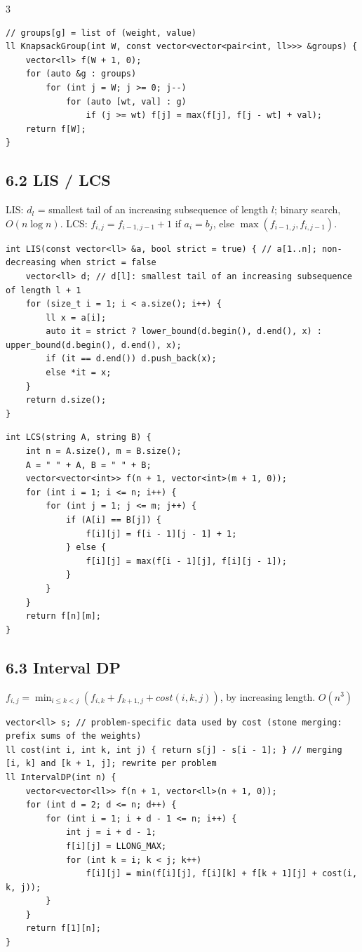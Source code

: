 \documentclass[8pt]{extarticle}
\begin{document}
\begin{multicols*}{3}
\begin{lstlisting}
// groups[g] = list of (weight, value)
ll KnapsackGroup(int W, const vector<vector<pair<int, ll>>> &groups) {
    vector<ll> f(W + 1, 0);
    for (auto &g : groups)
        for (int j = W; j >= 0; j--)
            for (auto [wt, val] : g)
                if (j >= wt) f[j] = max(f[j], f[j - wt] + val);
    return f[W];
}
\end{lstlisting}

\subsection*{6.2 LIS / LCS}

LIS: $d_l$ = smallest tail of an increasing subsequence of length $l$; binary search, $O(n \log n)$. LCS: $f_{i,j} = f_{i-1,j-1} + 1$ if $a_i = b_j$, else $\max(f_{i-1,j}, f_{i,j-1})$.

\begin{lstlisting}
int LIS(const vector<ll> &a, bool strict = true) { // a[1..n]; non-decreasing when strict = false
    vector<ll> d; // d[l]: smallest tail of an increasing subsequence of length l + 1
    for (size_t i = 1; i < a.size(); i++) {
        ll x = a[i];
        auto it = strict ? lower_bound(d.begin(), d.end(), x) : upper_bound(d.begin(), d.end(), x);
        if (it == d.end()) d.push_back(x);
        else *it = x;
    }
    return d.size();
}
\end{lstlisting}

\begin{lstlisting}
int LCS(string A, string B) {
    int n = A.size(), m = B.size();
    A = " " + A, B = " " + B;
    vector<vector<int>> f(n + 1, vector<int>(m + 1, 0));
    for (int i = 1; i <= n; i++) {
        for (int j = 1; j <= m; j++) {
            if (A[i] == B[j]) {
                f[i][j] = f[i - 1][j - 1] + 1;
            } else {
                f[i][j] = max(f[i - 1][j], f[i][j - 1]);
            }
        }
    }
    return f[n][m];
}
\end{lstlisting}

\subsection*{6.3 Interval DP}

$f_{i,j} = \min_{i \le k < j} (f_{i,k} + f_{k+1,j} + cost(i, k, j))$, by increasing length. $O(n^3)$

\begin{lstlisting}
vector<ll> s; // problem-specific data used by cost (stone merging: prefix sums of the weights)
ll cost(int i, int k, int j) { return s[j] - s[i - 1]; } // merging [i, k] and [k + 1, j]; rewrite per problem
ll IntervalDP(int n) {
    vector<vector<ll>> f(n + 1, vector<ll>(n + 1, 0));
    for (int d = 2; d <= n; d++) {
        for (int i = 1; i + d - 1 <= n; i++) {
            int j = i + d - 1;
            f[i][j] = LLONG_MAX;
            for (int k = i; k < j; k++)
                f[i][j] = min(f[i][j], f[i][k] + f[k + 1][j] + cost(i, k, j));
        }
    }
    return f[1][n];
}
\end{lstlisting}


\end{multicols*}
\end{document}
